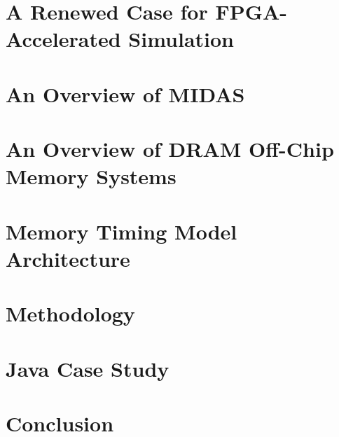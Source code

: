 \documentclass[masters]{ucbthesis}
\begin{document}
\chapter{A Renewed Case for FPGA-Accelerated Simulation}


\chapter{An Overview of MIDAS}


\chapter{An Overview of DRAM Off-Chip Memory Systems}


\chapter{Memory Timing Model Architecture}


\chapter{Methodology}


%

%

\chapter{Java Case Study}


\chapter{Conclusion}


\printbibliography
\end{document}
